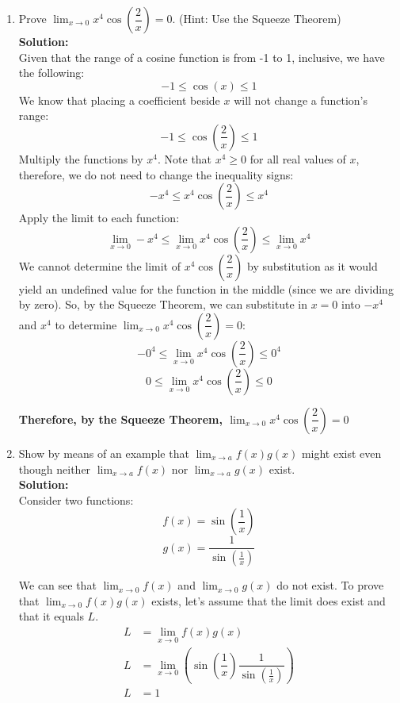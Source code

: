 \documentclass[12pt]{book}
\begin{document}
\begin{enumerate}
\item Prove  $\lim_{x\to 0}\limits x^4 \cos\left(\dfrac{2}{x}\right) = 0$. (Hint: Use the Squeeze Theorem) \\

\textbf{Solution:} \\
Given that the range of a cosine function is from -1 to 1, inclusive, we have the following:
    $$-1 \leq \cos\left(x\right) \leq 1$$
We know that placing a coefficient beside $x$ will not change a function's range:
    $$-1 \leq \cos\left(\dfrac{2}{x}\right) \leq 1$$
Multiply the functions by $x^4$. Note that $x^4 \geq 0$ for all real values of $x$, therefore, we do not need to change the inequality signs:
    $$-x^4 \leq x^4 \cos\left(\dfrac{2}{x}\right) \leq x^4$$
Apply the limit to each function:
    $$\lim_{x\to 0}\limits -x^4 \leq \lim_{x\to 0}\limits x^4 \cos\left(\dfrac{2}{x}\right) \leq \lim_{x\to 0}\limits x^4$$
We cannot determine the limit of $x^4 \cos\left(\dfrac{2}{x}\right)$ by substitution as it would yield an undefined value for the function in the middle (since we are dividing by zero). So, by the Squeeze Theorem, we can substitute in $x = 0$ into $-x^4$ and $x^4$ to determine $\lim_{x\to 0}\limits x^4 \cos\left(\dfrac{2}{x}\right) = 0$:
    $$-0^4 \leq \lim_{x\to 0}\limits x^4 \cos\left(\dfrac{2}{x}\right) \leq 0^4$$
    $$0 \leq \lim_{x\to 0}\limits x^4 \cos\left(\dfrac{2}{x}\right) \leq 0$$

\textbf{Therefore, by the Squeeze Theorem, $\lim_{x\to 0}\limits x^4 \cos\left(\dfrac{2}{x}\right) = 0$}
\newpage

\item Show by means of an example that  $\lim_{x\to a}\limits f(x)g(x)$ might exist even though neither $\lim_{x\to a}\limits f(x)$ nor $\lim_{x\to a}\limits g(x)$ exist. \\

\textbf{Solution:} \\
Consider two functions:
$$f(x) = \sin \left(\dfrac{1}{x}\right)$$
$$g(x) = \dfrac{1}{\sin \left(\frac{1}{x}\right)}$$

We can see that $\lim_{x\to 0}\limits f(x)$ and $\lim_{x\to 0}\limits g(x)$ do not exist. To prove that $\lim_{x\to 0}\limits f(x)g(x)$ exists, let's assume that the limit does exist and that it equals $L$.
\setcounter{equation}{0}
\begin{align}
    L &= \lim_{x\to 0}\limits f(x)g(x) \\
    L &= \lim_{x\to 0}\limits \left(\sin \left(\dfrac{1}{x}\right) \dfrac{1}{\sin \left(\frac{1}{x}\right)} \right) \\
    L &= 1
\end{align}
\setcounter{equation}{0}


\end{enumerate}
\end{document}

